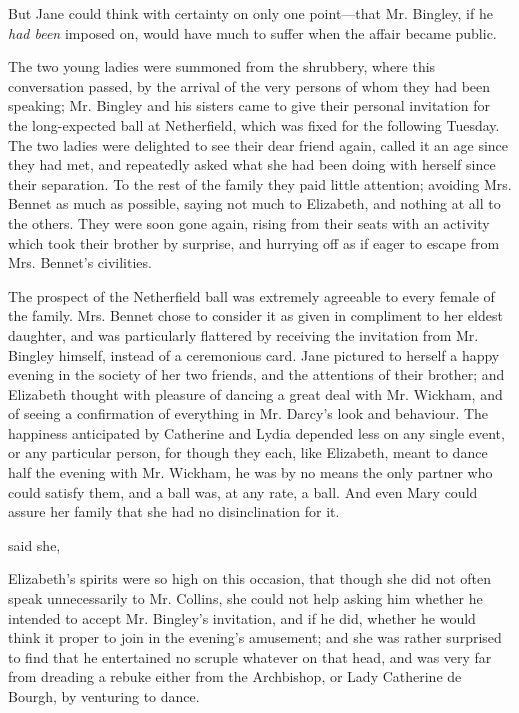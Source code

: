 But Jane could think with certainty on only one point---that Mr. Bingley, if he {\em had been} imposed on, would have much to suffer when the affair became public.

The two young ladies were summoned from the shrubbery, where this conversation passed, by the arrival of the very persons of whom they had been speaking; Mr. Bingley and his sisters came to give their personal invitation for the long-expected ball at Netherfield, which was fixed for the following Tuesday. The two ladies were delighted to see their dear friend again, called it an age since they had met, and repeatedly asked what she had been doing with herself since their separation. To the rest of the family they paid little attention; avoiding Mrs. Bennet as much as possible, saying not much to Elizabeth, and nothing at all to the others. They were soon gone again, rising from their seats with an activity which took their brother by surprise, and hurrying off as if eager to escape from Mrs. Bennet's civilities.

The prospect of the Netherfield ball was extremely agreeable to every female of the family. Mrs. Bennet chose to consider it as given in compliment to her eldest daughter, and was particularly flattered by receiving the invitation from Mr. Bingley himself, instead of a ceremonious card. Jane pictured to herself a happy evening in the society of her two friends, and the attentions of their brother; and Elizabeth thought with pleasure of dancing a great deal with Mr. Wickham, and of seeing a confirmation of everything in Mr. Darcy's look and behaviour. The happiness anticipated by Catherine and Lydia depended less on any single event, or any particular person, for though they each, like Elizabeth, meant to dance half the evening with Mr. Wickham, he was by no means the only partner who could satisfy them, and a ball was, at any rate, a ball. And even Mary could assure her family that she had no disinclination for it.

 said she, 

Elizabeth's spirits were so high on this occasion, that though she did not often speak unnecessarily to Mr. Collins, she could not help asking him whether he intended to accept Mr. Bingley's invitation, and if he did, whether he would think it proper to join in the evening's amusement; and she was rather surprised to find that he entertained no scruple whatever on that head, and was very far from dreading a rebuke either from the Archbishop, or Lady Catherine de Bourgh, by venturing to dance.

